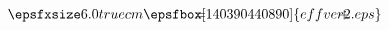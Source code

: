 \begin{equation}
\qquad \smash{\epsfxsize6.0truecm\epsfbox[140 390 440 890]{effver2.eps}}
\hspace*{-4.8cm} =
\hspace*{3.25cm} +
\qquad\qquad\qquad\quad
\end{equation}

